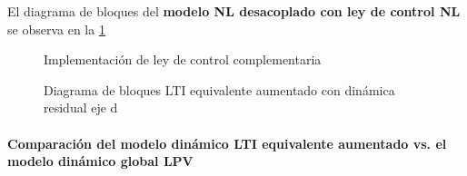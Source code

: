 \documentclass[a4paper, 10pt, onecolumn,journal]{ieeeconf}
\begin{document}
El diagrama de bloques del \textbf{modelo NL desacoplado con ley de control NL} se observa en la \cref{Implementación de ley de control complementaria}

\begin{figure}[thpb]
	\centering
	\begin{adjustbox}{max width=\columnwidth}
	\end{adjustbox}
	\caption{Implementación de ley de control complementaria}
	\label{Implementación de ley de control complementaria}
\end{figure}

\begin{figure}[thpb]
	\centering
	\begin{adjustbox}{max width=\columnwidth}
	\end{adjustbox}
	\caption{Diagrama de bloques LTI equivalente aumentado con dinámica residual eje d}
	\label{diagrama de bloques modelo LTI eq}
\end{figure}

\paragraph{\textbf{Comparación del modelo dinámico LTI equivalente aumentado vs. el modelo dinámico global LPV}}
\end{document}
